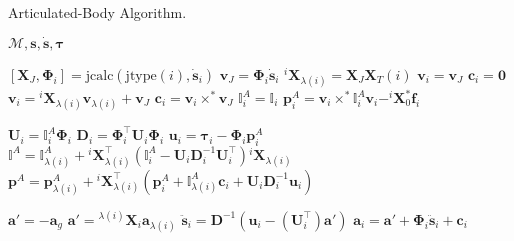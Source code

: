 \begin{algorithm}[h]
    \caption{Articulated-Body Algorithm.}
    \label{alg:aba}
    \begin{algorithmic}[1]
        \Require $\mathcal{M}, \mathbf{s}, \dot{\mathbf{s}}, \boldsymbol{\tau}$

        \State $[\mathbf{X}_J, \boldsymbol{\Phi}_i] = \text{jcalc}(\text{jtype}(i), \dot{\mathbf{s}}_i)$
        \State $\mathrm{\mathbf{v}}_J = \boldsymbol{\Phi}_i \dot{\mathbf{s}}_i$
        \State $^i\mathbf{X}_{\lambda(i)} = \mathbf{X}_J\mathbf{X}_T (i)$
        \State $\mathrm{\mathbf{v}}_i = \mathrm{\mathbf{v}}_J$
        \State $\mathbf{c}_i = \mathbf{0}$
        \Else
        \State $\mathrm{\mathbf{v}}_i = {}^i\mathbf{X} _{\lambda(i)}\mathrm{\mathbf{v}}_{\lambda(i)} + \mathrm{\mathbf{v}}_J$
        \State $\mathbf{c}_i = \mathrm{\mathbf{v}}_i \times ^* \mathrm{\mathbf{v}}_J$
        \EndIf
        \State $\mathbb{I} _i ^A = \mathbb{I} _i$
        \State $\mathbf{p}_i ^A = \mathrm{\mathbf{v}}_i \times^* \mathbb{I} _i ^A \mathrm{\mathbf{v}}_i - ^i\mathbf{X} _0 ^* \mathbf{f}_i $
        \EndFor

        \item[]

        \State $\mathbf{U}_i = \mathbb{I} _i ^A \boldsymbol{\Phi}_i$
        \State $\mathbf{D} _i = \boldsymbol{\Phi} ^\top _i  {} \mathbf{U} _i \boldsymbol{\Phi} _i $
        \State $\mathbf{u}_i = \boldsymbol{\tau}_i - \boldsymbol{\Phi}_i\mathbf{p}_i^A$
        \State $\mathbb{I} ^A = \mathbb{I} ^A _{\lambda (i)} + {} ^i \mathbf{X} _{\lambda (i)} ^\top (\mathbb{I} _i ^A - {}  \mathbf{U} _i  \mathbf{D} ^{-1} _i  {}  \mathbf{U} ^\top _i) {} ^i \mathbf{X} _{\lambda (i)} $
        \State $\mathbf{p} ^A = \mathbf{p} ^A _{\lambda (i)} + {} ^i \mathbf{X} _{\lambda (i)} ^\top (\mathbf{p} ^A_i + \mathbb{I} ^A _{\lambda (i)}  \mathbf{c}_i + {}  \mathbf{U} _i \mathbf{D} ^{-1} _i {} \mathbf{u} _i) $
        \EndIf
        \EndFor

        \item[]

        \State $\mathbf{a}' = -\mathbf{a}_g$
        \Else
        \State $\mathbf{a}' = {}^{\lambda(i)}\mathbf{X}_i \mathbf{a}_{\lambda(i)}$
        \State $\ddot{\mathbf{s}}_i = \mathbf{D}^{-1} (\mathbf{u}_i - (\mathbf{U}_i^\top)\mathbf{a}')$
        \State $\mathbf{a}_i = \mathbf{a}' + \boldsymbol{\Phi}_i\mathbf{\ddot{s}}_i + \mathbf{c} _i$
        \EndIf
        \EndFor
    \end{algorithmic}
\end{algorithm}
